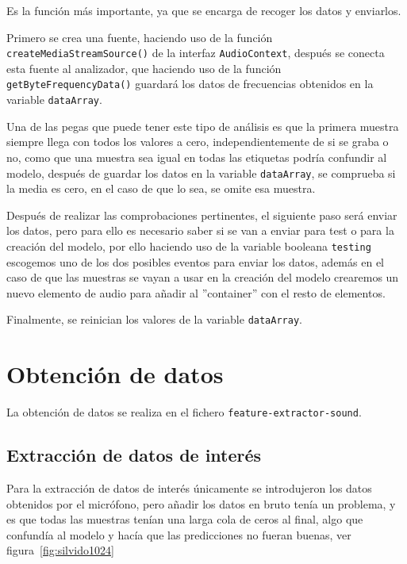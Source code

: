 \documentclass[a4paper, 12pt]{book}
\begin{document}
Es la función más importante, ya que se encarga de recoger los datos y enviarlos.

Primero se crea una fuente, haciendo uso de la función \texttt{createMediaStreamSource()} de la interfaz \texttt{AudioContext}, después se conecta esta fuente al analizador, que haciendo uso de la función \texttt{getByteFrequencyData()} guardará los datos de frecuencias obtenidos en la variable \texttt{dataArray}.

Una de las pegas que puede tener este tipo de análisis es que la primera muestra siempre llega con todos los valores a cero, independientemente de si se graba o no, como que una muestra sea igual en todas las etiquetas podría confundir al modelo, después de guardar los datos en la variable \texttt{dataArray}, se comprueba si la media es cero, en el caso de que lo sea, se omite esa muestra.

Después de realizar las comprobaciones pertinentes, el siguiente paso será enviar los datos, pero para ello es necesario saber si se van a enviar para test o para la creación del modelo, por ello haciendo uso de la variable booleana \texttt{testing} escogemos uno de los dos posibles eventos para enviar los datos, además en el caso de que las muestras se vayan a usar en la creación del modelo crearemos un nuevo elemento de audio para añadir al ''container'' con el resto de elementos.

Finalmente, se reinician los valores de la variable \texttt{dataArray}.

\section{Obtención de datos}
\label{sec:obtencion-datos}

La obtención de datos se realiza en el fichero \texttt{feature-extractor-sound}.

\subsection{Extracción de datos de interés}
\label{subsec:extraccion-datos}

Para la extracción de datos de interés únicamente se introdujeron los datos obtenidos por el micrófono, pero añadir los datos en bruto tenía un problema, y es que todas las muestras tenían una larga cola de ceros al final, algo que confundía al modelo y hacía que las predicciones no fueran buenas, ver figura~\ref{fig:silvido1024}
\end{document}
